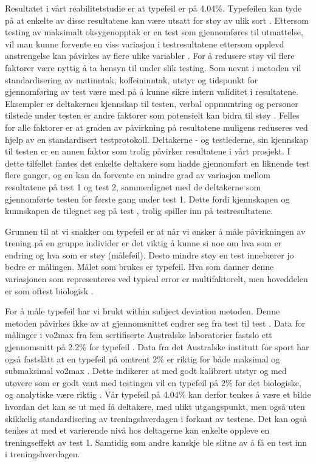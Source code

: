 \documentclass[
]{book}
\begin{document}
Resultatet i vårt reabilitetstudie er at typefeil er på 4.04\%. Typefeilen kan tyde på at enkelte av disse resultatene kan være utsatt for støy av ulik sort \citep{hopkins2000}. Ettersom testing av maksimalt oksygenopptak er en test som gjennomføres til utmattelse, vil man kunne forvente en viss variasjon i testresultatene ettersom opplevd anstrengelse kan påvirkes av flere ulike variabler \citep{halperin2015}. For å redusere støy vil flere faktorer være nyttig å ta hensyn til under slik testing. Som nevnt i metoden vil standardisering av matinntak, koffeininntak, utstyr og tidspunkt for gjennomføring av test være med på å kunne sikre intern validitet i resultatene. Eksempler er deltakernes kjennskap til testen, verbal oppmuntring og personer tilstede under testen er andre faktorer som potensielt kan bidra til støy \citep{halperin2015}. Felles for alle faktorer er at graden av påvirkning på resultatene muligens reduseres ved hjelp av en standardisert testprotokoll. Deltakerne - og testlederne, sin kjennskap til testen er en annen faktor som trolig påvirker resultatene i vårt prosjekt. I dette tilfellet fantes det enkelte deltakere som hadde gjennomført en liknende test flere ganger, og en kan da forvente en mindre grad av variasjon mellom resultatene på test 1 og test 2, sammenlignet med de deltakerne som gjennomførte testen for første gang under test 1. Dette fordi kjennskapen og kunnskapen de tilegnet seg på test , trolig spiller inn på testresultatene.

Grunnen til at vi snakker om typefeil er at når vi ønsker å måle påvirkningen av trening på en gruppe individer er det viktig å kunne si noe om hva som er endring og hva som er støy (målefeil). Desto mindre støy en test innebærer jo bedre er målingen. Målet som brukes er typefeil. Hva som danner denne variasjonen som representeres ved typical error er multifaktorelt, men hoveddelen er som oftest biologisk \citep{hopkins2000}.

For å måle typefeil har vi brukt within subject deviation metoden. Denne metoden påvirkes ikke av at gjennomsnittet endrer seg fra test til test \citep{hopkins2000}. Data for målinger i vo2max fra fem sertifiserte Australske laboratorier fastslo ett gjennomsnitt på 2.2\% for typefeil \citep{halperin2015}. Data fra det Australske institutt for sport har også fastslått at en typefeil på omtrent 2\% er riktig for både maksimal og submaksimal vo2max \citep{clark2007, robertson2010, saunders2009}. Dette indikerer at med godt kalibrert utstyr og med utøvere som er godt vant med testingen vil en typefeil på 2\% for det biologiske, og analytiske være riktig \citep{halperin2015}. Vår typefeil på 4.04\% kan derfor tenkes å være et bilde hvordan det kan se ut med få deltakere, med ulikt utgangspunkt, men også uten skikkelig standardisering av treningshverdagen i forkant av testene. Det kan også tenkes at med et varierende nivå hos deltagerne kan enkelte oppleve en treningseffekt av test 1. Samtidig som andre kanskje ble slitne av å få en test inn i treningshverdagen.
\end{document}
